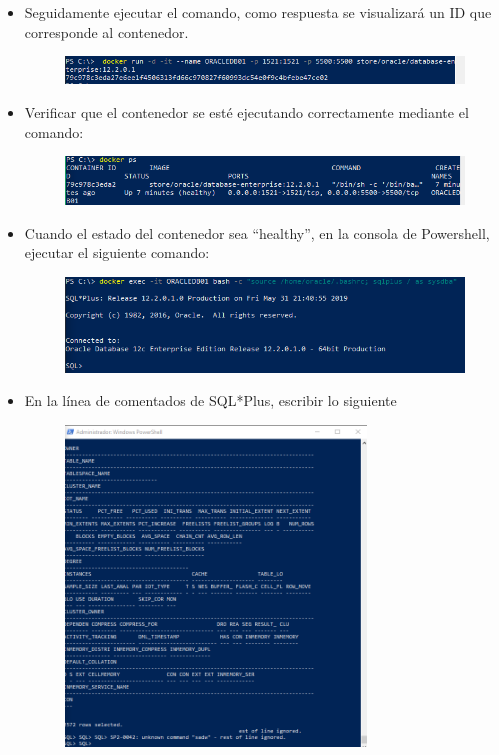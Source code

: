 \begin{itemize}
\begin{figure}[H]
\begin{center}
		\end{center}
		\end{figure}
	\item Seguidamente ejecutar el comando, como respuesta se visualizará un ID que corresponde al contenedor.
		\begin{figure}[H]
		\begin{center}
		\includegraphics[width=15cm]{./Imagenes/6}
		\end{center}
		\end{figure}
	\item Verificar que el contenedor se esté ejecutando correctamente mediante el comando:
		\begin{figure}[H]
		\begin{center}
		\includegraphics[width=15cm]{./Imagenes/7}
		\end{center}
		\end{figure}
	\item Cuando el estado del contenedor sea “healthy”, en la consola de Powershell, ejecutar el siguiente comando:
		\begin{figure}[H]
		\begin{center}
		\includegraphics[width=15cm]{./Imagenes/8}
		\end{center}
		\end{figure}
	\item En la línea de comentados de SQL*Plus, escribir lo siguiente
		\begin{figure}[H]
		\begin{center}
		\includegraphics[width=8cm]{./Imagenes/19}

\end{center}
\end{figure}
\end{itemize}
